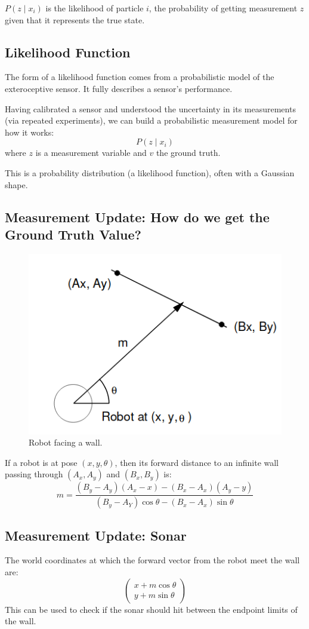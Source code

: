 \documentclass[11pt]{article}
\begin{document}
$P(z \mid x_i)$ is the likelihood of particle $i$, the probability of getting measurement $z$ given that it represents the true state.

\subsection{Likelihood Function}
The form of a likelihood function comes from a probabilistic model of the exteroceptive sensor.
It fully describes a sensor's performance.

Having calibrated a sensor and understood the uncertainty in its measurements (via repeated experiments), we can build a probabilistic measurement model for how it works:
\[
  P(z \mid x_i)
\]
where $z$ is a measurement variable and $v$ the ground truth.

This is a probability distribution (a likelihood function), often with a Gaussian shape.

\subsection{Measurement Update: How do we get the Ground Truth Value?}
\begin{figure}[h]
  \caption{Robot facing a wall.}
  \includegraphics[scale=0.4]{measurementupdate}
  \centering
\end{figure}
If a robot is at pose $(x, y, \theta)$, then its forward distance to an infinite wall passing through $(A_x, A_y)$ and $(B_x, B_y)$ is:
\[
  m = \frac{(B_y - A_y)(A_x - x) - (B_x - A_x)(A_y - y)}{(B_y - A_Y)\cos \theta - (B_x - A_x) \sin \theta}
\]

\subsection{Measurement Update: Sonar}
The world coordinates at which the forward vector from the robot meet the wall are:
\[
  \begin{pmatrix}
    x + m \cos \theta \\
    y + m \sin \theta
  \end{pmatrix}
\]
This can be used to check if the sonar should hit between the endpoint limits of the wall.
\end{document}
